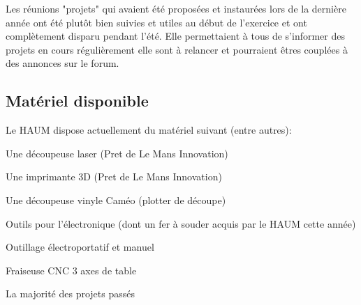 \documentclass[a4paper, 11pt]{article}
\begin{document}
\begin{appendices}
Les réunions "projets" qui avaient été proposées et instaurées lors de la dernière année
ont été plutôt bien suivies et utiles au début de l'exercice et ont complètement disparu
pendant l'été. Elle permettaient à tous de s'informer des projets en cours régulièrement
elle sont à relancer et pourraient êtres couplées à des annonces sur le forum.

\subsection{Matériel disponible}

Le HAUM dispose actuellement du matériel suivant (entre autres):

\begin{description}
    \item Une découpeuse laser (Pret de Le Mans Innovation)
    \item Une imprimante 3D (Pret de Le Mans Innovation)
    \item Une découpeuse vinyle Caméo (plotter de découpe)
    \item Outils pour l'électronique (dont un fer à souder acquis par le HAUM cette année)
    \item Outillage électroportatif et manuel
    \item Fraiseuse CNC 3 axes de table
    \item La majorité des projets passés
\end{description}


\end{appendices}
\end{document}

